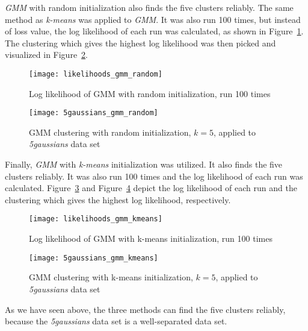 \textit{GMM} with random initialization also finds the five clusters reliably. The same method as \textit{k-means} was applied to \textit{GMM}. It was also run 100 times, but instead of loss value, the log likelihood of each run was calculated, as shown in Figure~\ref{fig:likelihoods_gmm_random}. The clustering which gives the highest log likelihood was then picked and visualized in Figure~\ref{fig:5gaussians_gmm_random}.

\begin{figure}[h!]
	\centering
	\texttt{[image: likelihoods\_gmm\_random]}
	\caption{Log likelihood of GMM with random initialization, run 100 times}
	\label{fig:likelihoods_gmm_random}
\end{figure}

\begin{figure}[h!]
	\centering
	\texttt{[image: 5gaussians\_gmm\_random]}
	\caption{GMM clustering with random initialization, $k=5$, applied to \textit{5gaussians} data set}
	\label{fig:5gaussians_gmm_random}
\end{figure}

Finally, \textit{GMM} with \textit{k-means} initialization was utilized. It also finds the five clusters reliably. It was also run 100 times and the log likelihood of each run was calculated. Figure~\ref{fig:likelihoods_gmm_kmeans} and Figure~\ref{fig:5gaussians_gmm_kmeans} depict the log likelihood of each run and the clustering which gives the highest log likelihood, respectively.

\begin{figure}[h!]
	\centering
	\texttt{[image: likelihoods\_gmm\_kmeans]}
	\caption{Log likelihood of GMM with k-means initialization, run 100 times}
	\label{fig:likelihoods_gmm_kmeans}
\end{figure}

\begin{figure}[h!]
	\centering
	\texttt{[image: 5gaussians\_gmm\_kmeans]}
	\caption{GMM clustering with k-means initialization, $k=5$, applied to \textit{5gaussians} data set}
	\label{fig:5gaussians_gmm_kmeans}
\end{figure}

As we have seen above, the three methods can find the five clusters reliably, because the \textit{5gaussians} data set is a well-separated data set.

{}\\

